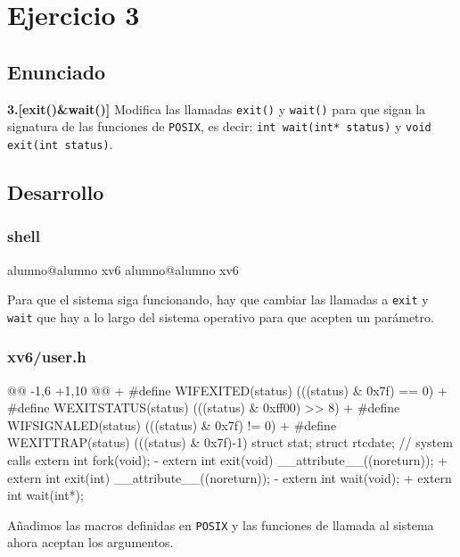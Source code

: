 \section{Ejercicio 3}
\subsection{Enunciado}
\begin{ejer}
    \textbf{3.[exit()\&wait()]} Modifica las llamadas \texttt{exit()} y \texttt{wait()} para que sigan la signatura de las
    funciones de \texttt{POSIX}, es decir: \texttt{int wait(int* status)} y \texttt{void exit(int status)}.
\end{ejer}
\subsection{Desarrollo}

\subsubsection{shell}
\begin{listing}[style=consola]
alumno@alumno xv6 %
alumno@alumno xv6 %
\end{listing}
\par Para que el sistema siga funcionando, hay que cambiar las llamadas a \texttt{exit} 
y \texttt{wait} que hay a lo largo del sistema operativo para que acepten un parámetro.

\subsubsection{xv6/user.h}
\begin{listing}
@@ -1,6 +1,10 @@
+   #define WIFEXITED(status)   (((status) & 0x7f) == 0)
+   #define WEXITSTATUS(status) (((status) & 0xff00) >> 8)
+   #define WIFSIGNALED(status) (((status) & 0x7f) != 0)
+   #define WEXITTRAP(status)   (((status) & 0x7f)-1)
    struct stat;
    struct rtcdate;
// system calls
    extern int fork(void);
-   extern int exit(void) __attribute__((noreturn));
+   extern int exit(int) __attribute__((noreturn));
-   extern int wait(void);
+   extern int wait(int*);
\end{listing}
\par Añadimos las macros definidas en \texttt{POSIX} y las funciones 
de llamada al sistema ahora aceptan los argumentos.

